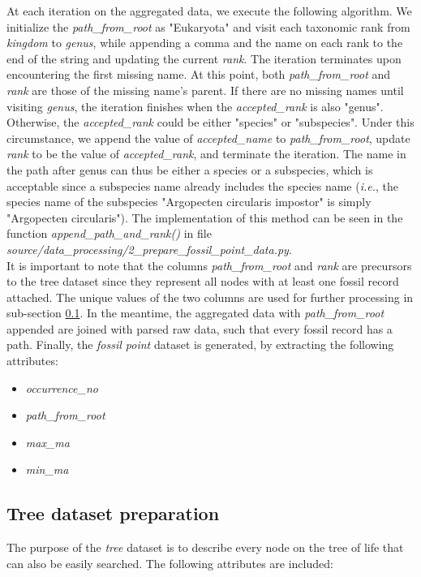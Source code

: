\documentclass[11pt, a4paper,oneside,chapterprefix=false]{scrbook}
\begin{document}
At each iteration on the aggregated data, we execute the following algorithm. We initialize the \emph{path\_from\_root} as "Eukaryota" and visit each taxonomic rank from \emph{kingdom} to \emph{genus}, while appending a comma and the name on each rank to the end of the string and updating the current \emph{rank}. The iteration terminates upon encountering the first missing name. At this point, both \emph{path\_from\_root} and \emph{rank} are those of the missing name's parent. If there are no missing names until visiting \emph{genus}, the iteration finishes when the \emph{accepted\_rank} is also "genus". Otherwise, the \emph{accepted\_rank} could be either "species" or "subspecies". Under this circumstance, we append the value of \emph{accepted\_name} to \emph{path\_from\_root}, update \emph{rank} to be the value of \emph{accepted\_rank}, and terminate the iteration. The name in the path after genus can thus be either a species or a subspecies, which is acceptable since a subspecies name already includes the species name (\emph{i.e.}, the species name of the subspecies "Argopecten circularis impostor" is simply "Argopecten circularis"). The implementation of this method can be seen in the function \emph{append\_path\_and\_rank()} in file \emph{source/data\_processing/2\_prepare\_fossil\_point\_data.py}.\\

It is important to note that the columns \emph{path\_from\_root} and \emph{rank} are precursors to the tree dataset since they represent all nodes with at least one fossil record attached. The unique values of the two columns are used for further processing in sub-section \ref{subsec:tree_preparation}. In the meantime, the aggregated data with \emph{path\_from\_root} appended are joined with parsed raw data, such that every fossil record has a path. Finally, the \emph{fossil point} dataset is generated, by extracting the following attributes: 

\begin{itemize}
	\item \textit{occurrence\_no}
	\item \textit{path\_from\_root}
	\item \textit{max\_ma}
	\item \textit{min\_ma}
\end{itemize}


\subsection{Tree dataset preparation} \label{subsec:tree_preparation}
The purpose of the \emph{tree} dataset is to describe every node on the tree of life that can also be easily searched. The following attributes are included: \\
\end{document}
